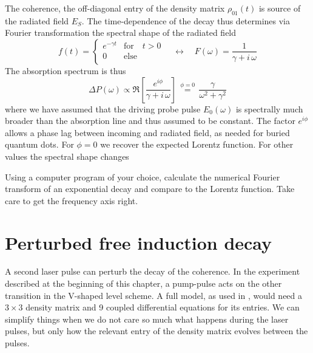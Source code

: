 The coherence, the off-diagonal entry of the density matrix $\rho_{01}(t)$ is source of the radiated field $E_S$. The time-dependence of the decay thus determines via Fourier transformation the spectral shape of the radiated field
\begin{equation}
 f(t) = \left\{ \begin{array}{ll}
e^{- \gamma t } & \text{for} \quad t > 0 \\
 0 & \text{else} \\
 \end{array}
 \right.
 \quad 
 \leftrightarrow \quad
  F(\omega) = \frac{1}{\gamma + i \, \omega}
\end{equation}
The absorption spectrum is thus
\begin{equation}
\Delta P (\omega)  \propto \Re \left[  \frac{e^{i \phi}}{\gamma + i \, \omega}       \right] \, \overset{\phi = 0}{=} \, \frac{\gamma}{\omega^2 + \gamma^2}
\end{equation}
where we have assumed that the driving probe pulse $E_0(\omega)$ is spectrally much broader than the absorption line and thus assumed to be constant. The factor $e^{i \phi}$ allows a phase lag between incoming and radiated field, as needed for buried quantum dots. For $\phi = 0$ we recover the expected Lorentz function. For other values the spectral shape changes

\begin{questions}

\item Using a computer program of your choice, calculate  the numerical Fourier transform of an exponential decay and compare to the Lorentz function. Take care to get the frequency axis right.

\end{questions}
 
 
 
\section{Perturbed free induction decay}

A second laser pulse can perturb the decay of the coherence. In the experiment described at the beginning of this chapter, a pump-pulse acts on the other transition in the V-shaped level scheme. A full model, as used in \citep{Wolpert:2012hs}, would need a $3 \times 3$ density matrix and 9 coupled differential equations for its entries. We can simplify things when we do not care so much what happens during the laser pulses, but only how the relevant entry of the density matrix evolves between the pulses.

